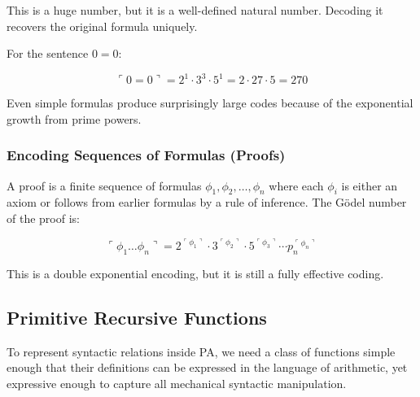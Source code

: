This is a huge number, but it is a well-defined natural number. Decoding it recovers the original formula uniquely.

For the sentence $0 = 0$:

\[
\ulcorner 0 = 0 \urcorner = 2^{1} \cdot 3^{3} \cdot 5^{1} = 2 \cdot 27 \cdot 5 = 270
\]

Even simple formulas produce surprisingly large codes because of the exponential growth from prime powers.

\subsubsection*{Encoding Sequences of Formulas (Proofs)}

A proof is a finite sequence of formulas $\phi_1, \phi_2, \dots, \phi_n$ where each $\phi_i$ is either an axiom or follows from earlier formulas by a rule of inference. The Gödel number of the proof is:

\[
\ulcorner \phi_1 \dots \phi_n \urcorner = 2^{\ulcorner \phi_1 \urcorner} \cdot 3^{\ulcorner \phi_2 \urcorner} \cdot 5^{\ulcorner \phi_3 \urcorner} \cdots p_n^{\ulcorner \phi_n \urcorner}
\]

This is a double exponential encoding, but it is still a fully effective coding.

\subsection{Primitive Recursive Functions}
\label{sec:godel:primrec}

To represent syntactic relations inside PA, we need a class of functions simple enough that their definitions can be expressed in the language of arithmetic, yet expressive enough to capture all mechanical syntactic manipulation.

